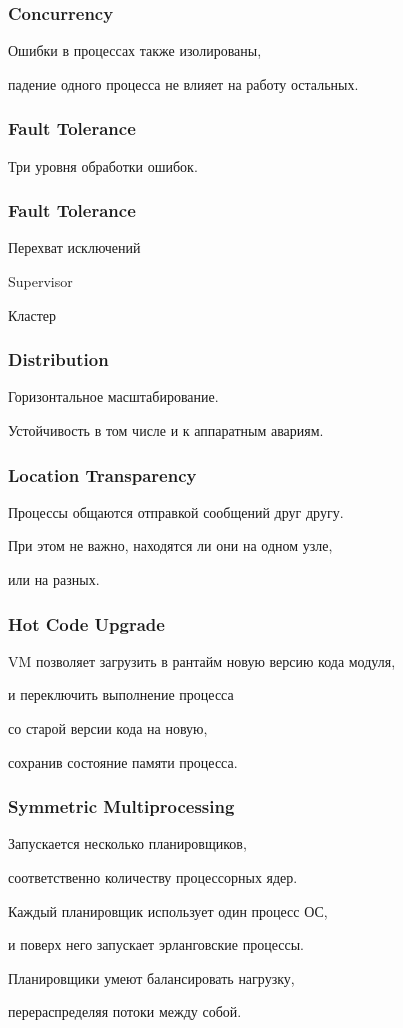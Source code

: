 \documentclass[10pt]{beamer}
\begin{document}
\begin{frame}
\frametitle{Concurrency}
\centering
Ошибки в процессах также изолированы,
\par \bigskip
падение одного процесса не влияет на работу остальных.
\end{frame}

\begin{frame}
\frametitle{Fault Tolerance}
\centering
Три уровня обработки ошибок.
\end{frame}

\begin{frame}
\frametitle{Fault Tolerance}
\centering
Перехват исключений
\par \bigskip
Supervisor
\par \bigskip
Кластер
\end{frame}

\begin{frame}
\frametitle{Distribution}
\centering
Горизонтальное масштабирование.
\par \bigskip
Устойчивость в том числе и к аппаратным авариям.
\end{frame}

\begin{frame}
\frametitle{Location Transparency}
\centering
Процессы общаются отправкой сообщений друг другу.
\par \bigskip
При этом не важно, находятся ли они на одном узле,
\par \bigskip
или на разных.
\end{frame}

\begin{frame}
\frametitle{Hot Code Upgrade}
\centering
VM позволяет загрузить в рантайм новую версию кода модуля,
\par \bigskip
и переключить выполнение процесса
\par \bigskip
со старой версии кода на новую,
\par \bigskip
сохранив состояние памяти процесса.
\end{frame}

\begin{frame}
\frametitle{Symmetric Multiprocessing}
\centering
Запускается несколько планировщиков,
\par
соответственно количеству процессорных ядер.
\par \bigskip
Каждый планировщик использует один процесс ОС,
\par
и поверх него запускает эрланговские процессы.
\par \bigskip
Планировщики умеют балансировать нагрузку,
\par
перераспределяя потоки между собой.
\end{frame}
\end{document}

